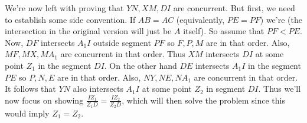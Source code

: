 \documentclass[11pt,a4paper]{article}
\begin{document}
\begin{enumerate}
	
	We're now left with proving that $YN, XM, DI$ are concurrent. 
	But first, we need to establish some side convention. 
	If $AB=AC$ (equivalently, $PE=PF$) we're (the intersection in the original version will just be $A$ itself). 
	So assume that $PF < PE$. 
	Now, $DF$ intersects $A_1I$ outside segment $PF$ so $F, P, M$ are in that order. 
	Also, $MF, MX, MA_1$ are concurrent in that order. 
	Thus $XM$ intersects $DI$ at some point $Z_1$ in the segment $DI$. 
	On the other hand $DE$ intersects $A_1I$ in the segment $PE$ so 
	$P, N, E$ are in that order. 
	Also, $NY, NE, NA_1$ are concurrent in that order. 
	It follows that $YN$ also intersects $A_1I$ at some point $Z_2$ in segment $DI$. 
	Thus we'll now focus on showing $\frac{IZ_1}{Z_1D} = \frac{IZ_2}{Z_2D}$, 
	which will then solve the problem since this would imply $Z_1=Z_2$. 
	

\end{enumerate}
\end{document}
